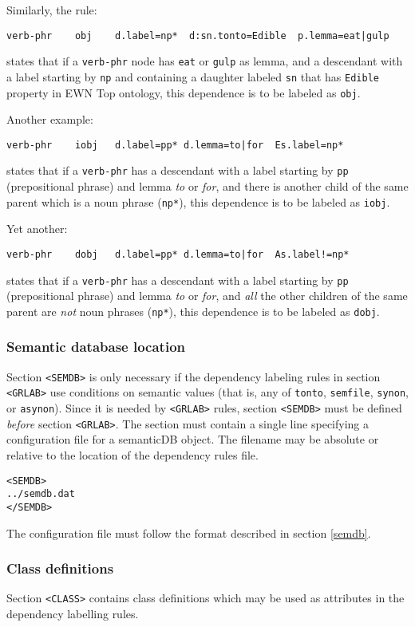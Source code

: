 \documentclass[a4paper]{book}
\begin{document}
   Similarly, the rule:
\begin{verbatim}
verb-phr    obj    d.label=np*  d:sn.tonto=Edible  p.lemma=eat|gulp
\end{verbatim}
  states that if a \verb#verb-phr# node has {\tt eat} or {\tt gulp} as
  lemma, and a descendant with a label starting by \verb#np# and containing
  a daughter labeled \verb#sn# that has {\tt Edible} property in EWN
  Top ontology, this dependence is to be labeled as \verb#obj#.

   Another example:
\begin{verbatim}
verb-phr    iobj   d.label=pp* d.lemma=to|for  Es.label=np*
\end{verbatim}
  states that if a \verb#verb-phr# has a descendant with a label
  starting by \verb#pp# (prepositional phrase) and lemma {\em to} or
  {\em for}, and there is another child of the same parent which is 
  a noun phrase (\verb#np*#), this dependence is to be
  labeled as \verb#iobj#.

   Yet another:
\begin{verbatim}
verb-phr    dobj   d.label=pp* d.lemma=to|for  As.label!=np*
\end{verbatim}
  states that if a \verb#verb-phr# has a descendant with a label
  starting by \verb#pp# (prepositional phrase) and lemma {\em to} or
  {\em for}, and {\em all} the other children of the same parent are {\em not}
  noun phrases (\verb#np*#), this dependence is to be
  labeled as \verb#dobj#.

\subsubsection{Semantic database location}
  Section \verb#<SEMDB># is only necessary if the dependency labeling rules in section \verb#<GRLAB># use conditions on semantic values (that is, any of \verb#tonto#, \verb#semfile#, \verb#synon#, or \verb#asynon#).  Since it is needed by \verb#<GRLAB># rules, section \verb#<SEMDB># must be defined {\em before} section \verb#<GRLAB>#.
  The section must contain a single line specifying a configuration file for a semanticDB object. The filename may be absolute or relative to the location of the dependency rules file.
\begin{verbatim}
<SEMDB>
../semdb.dat
</SEMDB>
\end{verbatim}

  The configuration file must follow the format described in section \ref{semdb}.

\subsubsection{Class definitions}
    Section \verb#<CLASS># contains class definitions which may
   be used as attributes in the dependency labelling rules.
\end{document}

